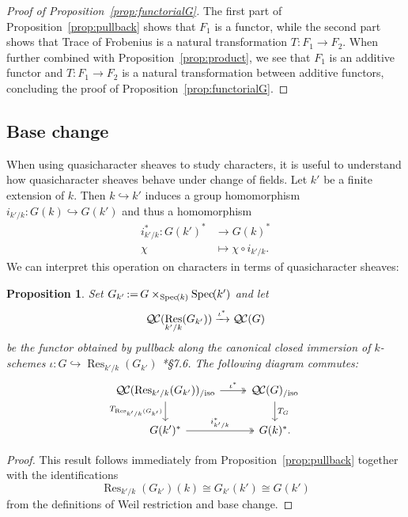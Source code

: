 \documentclass{amsart}
\theoremstyle{plain}
\newtheorem{proposition}[theorem]{Proposition}
\theoremstyle{definition}
\theoremstyle{remark}
\DeclareMathOperator{\Res}{Res}
\newcommand{\Spec}[1]{{\operatorname{Spec}\hskip-1pt( #1 )}}
\newcommand{\ceq}{{\, :=\, }}
\newcommand{\QC}{{\mathcal{Q\hskip-0.8pt C}}}
\newcommand{\QCiso}[1]{\QC(#1)_{/\text{iso}}}
\newcommand{\TrFrob}[1]{T_{#1}}
\begin{document}
\begin{proof}[Proof of Proposition~\ref{prop:functorialG}]
The first part of Proposition~\ref{prop:pullback} shows that $F_1$ is a functor,
while the second part shows that Trace of Frobenius is a natural transformation
$T: F_1 \to F_2$. When further combined with Proposition~\ref{prop:product},
we see that $F_1$ is an additive functor and $T: F_1 \to F_2$ is a natural
transformation between additive functors,
concluding the proof of Proposition~\ref{prop:functorialG}.
\end{proof}

\subsection{Base change}\label{sec:basechange}

When using quasicharacter sheaves to study characters, it is useful to understand
how quasicharacter sheaves behave under change of fields.
Let $k'$ be a finite extension of $k$. Then $k \hookrightarrow k'$ induces a group homomorphism
$i_{k'/k} : G(k) \hookrightarrow G(k')$ and thus a homomorphism
\begin{align*}
i_{k'/k}^* : G(k')^* &\to G(k)^* \\
\chi &\mapsto \chi\circ i_{k'/k}.
\end{align*}
We can interpret this operation on characters in terms of quasicharacter sheaves:

\begin{proposition} \label{prop:csbe}
Set $G_{k'} \ceq G\times_\Spec{k} \Spec{k'}$ and let
\[
\QC(\Res_{k'/k}(G_{k'})) \xrightarrow{\iota^*} \QC(G)
\]
be the functor obtained by pullback along the canonical closed immersion of $k$-schemes
$\iota : G \hookrightarrow \Res_{k'/k}(G_{k'})$
\cite{bosch-lutkebohmert-reynaud:NeronModels}*{\S 7.6}.
The following diagram commutes:
\[
\begin{tikzcd}
\QCiso{\Res_{k'/k}(G_{k'})} \arrow[two heads]{r}{\iota^*} \dar[swap]{\TrFrob{\Res_{k'/k}(G_{k'})}} & \QCiso{G} \dar{\TrFrob{G}} \\
G(k')^* \arrow[two heads]{r}{i_{k'/k}^*} & G(k)^*.
\end{tikzcd}
\]
\end{proposition}
\begin{proof}
This result follows immediately from Proposition~\ref{prop:pullback} together with the identifications
\[
\Res_{k'/k}(G_{k'})(k) \cong G_{k'}(k') \cong G(k')
\]
from the definitions of Weil restriction and base change.
\end{proof}
\end{document}
